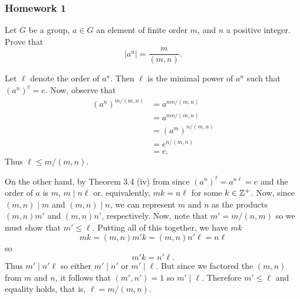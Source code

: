 \newpage

\subsubsection{Homework 1}
\setcounter{exercise}{0}
\setcounter{equation}{0}

\begin{problem}
  Let $G$ be a group, $a\in G$ an element of finite order $m$, and $n$ a
  positive integer. Prove that
  \[
    |a^n|=\frac{m}{(m,n)}.
  \]
\end{problem}
\begin{solution}
  Let $\ell$ denote the order of $a^n$. Then $\ell$ is the minimal power of
  $a^n$ such that ${(a^n)}^\ell=e$. Now, observe that
  \begin{equation}
    \label{eq:1:1}
    \begin{aligned}
      {(a^n)}^{m/(m,n)}
      &=a^{nm/(m,n)}\\
      &=a^{mn/(m,n)}\\
      &={(a^m)}^{n/(m,n)}\\
      &=e^{n/(m,n)}\\
      &=e.
    \end{aligned}
  \end{equation}
  Thus $\ell\leq m/(m,n)$.

  On the other hand, by Theorem 3.4 (iv) from \cite[Ch.\@ I \S 3.3, p.\@
  35]{hungerford} since ${(a^n)}^\ell=a^{n\ell}=e$ and the order of $a$ is
  $m$, $m\mid n\ell$ or, equivalently, $mk=n\ell$ for some
  $k\in\mathbb{Z}^+$. Now, since $(m,n)\mid m$ and $(m,n)\mid n$, we can
  represent $m$ and $n$ as the products $(m,n)m'$ and $(m,n)n'$,
  respectively. Now, note that $m'=m/(n,m)$ so we must show that
  $m'\leq\ell$. Putting all of this together, we have $mk$
  \begin{equation}
    \label{eq:1:2}
    mk=(m,n)m'k=(m,n)n'\ell=n\ell
  \end{equation}
  so
  \begin{equation}
    \label{eq:1:3}
    m'k=n'\ell.
  \end{equation}
  Thus $m'\mid n'\ell$ so either $m'\mid n'$ or $m'\mid\ell$. But since we
  factored the $(m,n)$ from $m$ and $n$, it follows that $(m',n')=1$ so
  $m'\mid \ell$. Therefore $m'\leq\ell$ and equality holds, that is,
  $\ell=m/(m,n)$.
\end{solution}

